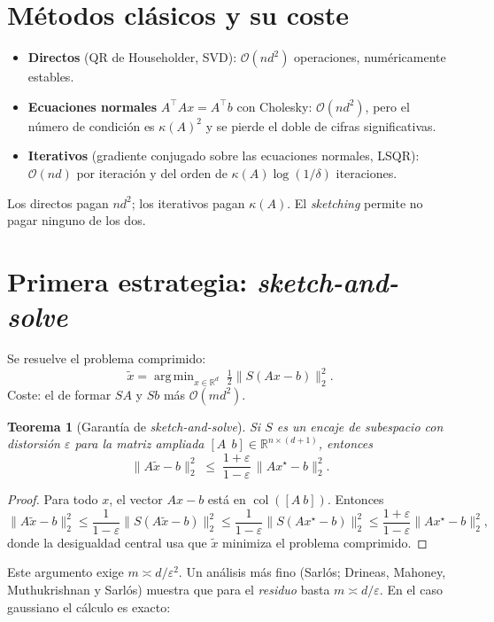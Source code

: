 \documentclass[11pt,a4paper,oneside]{book}
\newtheorem{teorema}{Teorema}[chapter]
\theoremstyle{definition}
\theoremstyle{remark}
\newcommand{\R}{\mathbb{R}}
\newcommand{\cO}{\mathcal{O}}
\newcommand{\T}{^{\top}}
\newcommand{\eps}{\varepsilon}
\newcommand{\nrm}[1]{\lVert #1\rVert}
\DeclareMathOperator{\col}{col}
\DeclareMathOperator*{\argmin}{arg\,min}
\begin{document}
\section{Métodos clásicos y su coste}

\begin{itemize}
  \item \textbf{Directos} (QR de Householder, SVD): $\cO(nd^2)$ operaciones, numéricamente estables.
  \item \textbf{Ecuaciones normales} $A\T Ax=A\T b$ con Cholesky: $\cO(nd^2)$, pero el número de condición es
        $\kappa(A)^2$ y se pierde el doble de cifras significativas.
  \item \textbf{Iterativos} (gradiente conjugado sobre las ecuaciones normales, LSQR): $\cO(nd)$ por iteración y del
        orden de $\kappa(A)\log(1/\delta)$ iteraciones.
\end{itemize}
Los directos pagan $nd^2$; los iterativos pagan $\kappa(A)$. El \emph{sketching} permite no pagar ninguno de los dos.

\section{Primera estrategia: \emph{sketch-and-solve}}

Se resuelve el problema comprimido:
\begin{equation}\label{eq:sas}
  \tilde x=\argmin_{x\in\R^d}\;\tfrac12\nrm{S(Ax-b)}_2^2 .
\end{equation}
Coste: el de formar $SA$ y $Sb$ más $\cO(md^2)$.

\begin{teorema}[Garantía de \emph{sketch-and-solve}]\label{teo:sas}
Si $S$ es un encaje de subespacio con distorsión $\eps$ para la matriz ampliada $[A\ \ b]\in\R^{n\times(d+1)}$, entonces
\[ \nrm{A\tilde x-b}_2^2\;\le\;\frac{1+\eps}{1-\eps}\,\nrm{Ax^\star-b}_2^2 . \]
\end{teorema}

\begin{proof}
Para todo $x$, el vector $Ax-b$ está en $\col([A\ b])$. Entonces
\[ \nrm{A\tilde x-b}_2^2\le\frac{1}{1-\eps}\nrm{S(A\tilde x-b)}_2^2\le\frac{1}{1-\eps}\nrm{S(Ax^\star-b)}_2^2\le\frac{1+\eps}{1-\eps}\nrm{Ax^\star-b}_2^2, \]
donde la desigualdad central usa que $\tilde x$ minimiza el problema comprimido.
\end{proof}

Este argumento exige $m\asymp d/\eps^2$. Un análisis más fino (Sarlós; Drineas, Mahoney, Muthukrishnan y
Sarlós) muestra que para el \emph{residuo} basta $m\asymp d/\eps$. En el caso gaussiano el cálculo es exacto:
\end{document}
